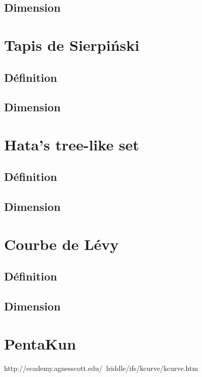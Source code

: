 \documentclass[a4paper, 12pt]{report}
\begin{document}
			\subsection{Dimension}
		\section{Tapis de Sierpiński}
			\subsection{Définition}
			\subsection{Dimension}
		\section{Hata's tree-like set}
			\subsection{Définition}
			\subsection{Dimension}
		\section{Courbe de Lévy}
			\subsection{Définition}
			\subsection{Dimension}
		\section{PentaKun}
http://ecademy.agnesscott.edu/~lriddle/ifs/kcurve/kcurve.htm
\end{document}
